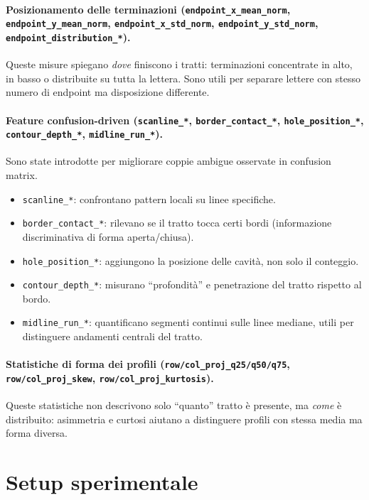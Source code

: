 \documentclass[a4paper,12pt]{article}
\begin{document}
\paragraph{Posizionamento delle terminazioni (\texttt{endpoint\_x\_mean\_norm}, \texttt{endpoint\_y\_mean\_norm}, \texttt{endpoint\_x\_std\_norm}, \texttt{endpoint\_y\_std\_norm}, \texttt{endpoint\_distribution\_*}).}
Queste misure spiegano \textit{dove} finiscono i tratti: terminazioni concentrate in alto, in basso o distribuite su tutta la lettera. Sono utili per separare lettere con stesso numero di endpoint ma disposizione differente.

\paragraph{Feature confusion-driven (\texttt{scanline\_*}, \texttt{border\_contact\_*}, \texttt{hole\_position\_*}, \texttt{contour\_depth\_*}, \texttt{midline\_run\_*}).}
Sono state introdotte per migliorare coppie ambigue osservate in confusion matrix.
\begin{itemize}[leftmargin=1.5em]
  \item \texttt{scanline\_*}: confrontano pattern locali su linee specifiche.
  \item \texttt{border\_contact\_*}: rilevano se il tratto tocca certi bordi (informazione discriminativa di forma aperta/chiusa).
  \item \texttt{hole\_position\_*}: aggiungono la posizione delle cavità, non solo il conteggio.
  \item \texttt{contour\_depth\_*}: misurano ``profondità'' e penetrazione del tratto rispetto al bordo.
  \item \texttt{midline\_run\_*}: quantificano segmenti continui sulle linee mediane, utili per distinguere andamenti centrali del tratto.
\end{itemize}

\paragraph{Statistiche di forma dei profili (\texttt{row/col\_proj\_q25/q50/q75}, \texttt{row/col\_proj\_skew}, \texttt{row/col\_proj\_kurtosis}).}
Queste statistiche non descrivono solo ``quanto'' tratto è presente, ma \textit{come} è distribuito: asimmetria e curtosi aiutano a distinguere profili con stessa media ma forma diversa.

\section{Setup sperimentale}
\end{document}
